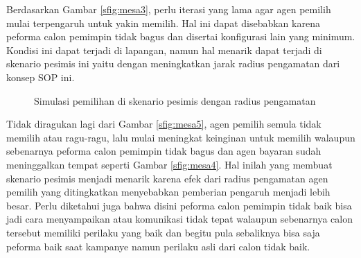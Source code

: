 Berdasarkan Gambar \ref{sfig:mesa3}, perlu iterasi yang lama agar agen pemilih mulai terpengaruh untuk yakin memilih. Hal ini dapat disebabkan karena peforma calon pemimpin tidak bagus dan disertai konfigurasi lain yang minimum. Kondisi ini dapat terjadi di lapangan, namun hal menarik dapat terjadi di skenario pesimis ini yaitu dengan meningkatkan jarak radius pengamatan dari konsep SOP ini.

\begin{figure}[H]
	\centering
	\hfill
	\hfill
	\caption{Simulasi pemilihan di skenario pesimis dengan radius pengamatan}
	\label{fig:simulasi_mesa_pesimis_2}
\end{figure}

Tidak diragukan lagi dari Gambar \ref{sfig:mesa5}, agen pemilih semula tidak memilih atau ragu-ragu, lalu mulai meningkat keinginan untuk memilih walaupun sebenarnya peforma calon pemimpin tidak bagus dan agen bayaran sudah meninggalkan tempat seperti Gambar \ref{sfig:mesa4}. Hal inilah yang membuat skenario pesimis menjadi menarik karena efek dari radius pengamatan agen pemilih yang ditingkatkan menyebabkan pemberian pengaruh menjadi lebih besar. Perlu diketahui juga bahwa disini peforma calon pemimpin tidak baik bisa jadi cara menyampaikan atau komunikasi tidak tepat walaupun sebenarnya calon tersebut memiliki perilaku yang baik dan begitu pula sebaliknya bisa saja peforma baik saat kampanye namun perilaku asli dari calon tidak baik.

